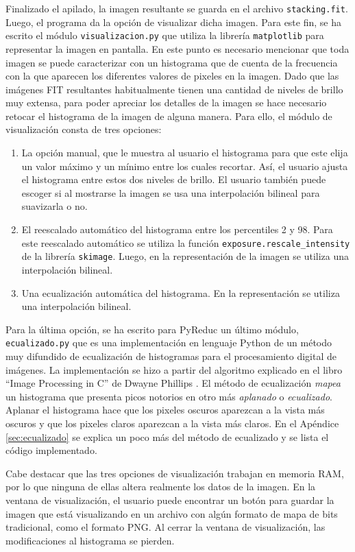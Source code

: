 \documentclass[a4paper, 12pt]{article}
\begin{document}
Finalizado el apilado, la imagen resultante se guarda en el archivo \texttt{stacking.fit}. Luego, el programa da la opción de visualizar dicha imagen. Para este fin, se ha escrito el módulo \texttt{visualizacion.py} que utiliza la librería {\tt matplotlib} para representar la imagen en pantalla. En este punto es necesario mencionar que toda imagen se puede caracterizar con un histograma que de cuenta de la frecuencia con la que aparecen los diferentes valores de pixeles en la imagen. Dado que las imágenes FIT resultantes habitualmente tienen una cantidad de niveles de brillo muy extensa, para poder apreciar los detalles de la imagen se hace necesario retocar el histograma de la imagen de alguna manera. Para ello, el módulo de visualización consta de tres opciones:
\begin{enumerate}
\item La opción manual, que le muestra al usuario el histograma para que este elija un valor máximo y un mínimo entre los cuales recortar. Así, el usuario ajusta el histograma entre estos dos niveles de brillo. El usuario también puede escoger si al mostrarse la imagen se usa una interpolación bilineal para suavizarla o no.
\item El reescalado automático del histograma entre los percentiles 2 y 98. Para este reescalado automático se utiliza la función {\tt exposure.rescale\_intensity} de la librería {\tt skimage}. Luego, en la representación de la imagen se utiliza una interpolación bilineal.
\item Una ecualización automática del histograma. En la representación se utiliza una interpolación bilineal.
\end{enumerate}

Para la última opción, se ha escrito para PyReduc un último módulo, {\tt ecualizado.py} que es una implementación en lenguaje Python de un método muy difundido de ecualización de histogramas para el procesamiento digital de imágenes. La implementación se hizo a partir del algoritmo explicado en el libro ``Image Processing in C'' de Dwayne Phillips \cite{phillips}. El método de ecualización {\it mapea} un histograma que presenta picos notorios en otro más {\it aplanado} o {\it ecualizado}. Aplanar el histograma hace que los pixeles oscuros aparezcan a la vista más oscuros y que los pixeles claros aparezcan a la vista más claros. En el Apéndice \ref{sec:ecualizado} se explica un poco más del método de ecualizado y se lista el código implementado.


Cabe destacar que las tres opciones de visualización trabajan en memoria RAM, por lo que ninguna de ellas altera realmente los datos de la imagen. En la ventana de visualización, el usuario puede encontrar un botón para guardar la imagen que está visualizando en un archivo con algún formato de mapa de bits tradicional, como el formato PNG. Al cerrar la ventana de visualización, las modificaciones al histograma se pierden.
\end{document}
